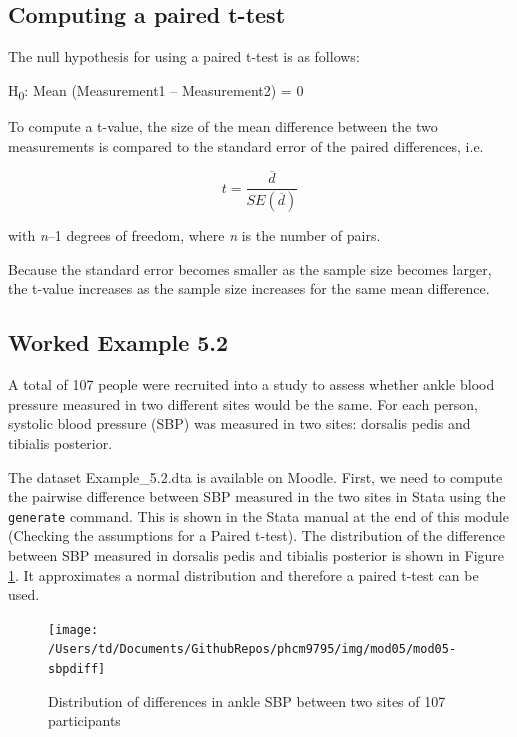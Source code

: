 \documentclass[
]{memoir}
\begin{document}
\hypertarget{computing-a-paired-t-test}{%
\subsection{Computing a paired t-test}\label{computing-a-paired-t-test}}

The null hypothesis for using a paired t-test is as follows:

H\textsubscript{0}: Mean (Measurement1 -- Measurement2) = 0

To compute a t-value, the size of the mean difference between the two measurements is compared to the standard error of the paired differences, i.e.

\[t = \frac{\overline{d}}{SE(\overline{d})}\]

with \emph{n}--1 degrees of freedom, where \emph{n} is the number of pairs.

Because the standard error becomes smaller as the sample size becomes larger, the t-value increases as the sample size increases for the same mean difference.

\hypertarget{worked-example-5.2}{%
\subsection{Worked Example 5.2}\label{worked-example-5.2}}

A total of 107 people were recruited into a study to assess whether ankle blood pressure measured in two different sites would be the same. For each person, systolic blood pressure (SBP) was measured in two sites: dorsalis pedis and tibialis posterior.

The dataset Example\_5.2.dta is available on Moodle. First, we need to compute the pairwise difference between SBP measured in the two sites in Stata using the \texttt{generate} command. This is shown in the Stata manual at the end of this module (Checking the assumptions for a Paired t-test). The distribution of the difference between SBP measured in dorsalis pedis and tibialis posterior is shown in Figure \ref{fig:mod05-sbpdiff}. It approximates a normal distribution and therefore a paired t-test can be used.

\begin{figure}
\texttt{[image: /Users/td/Documents/GithubRepos/phcm9795/img/mod05/mod05-sbpdiff]} \caption{Distribution of differences in ankle SBP between two sites of 107 participants}\label{fig:mod05-sbpdiff}
\end{figure}
\end{document}

